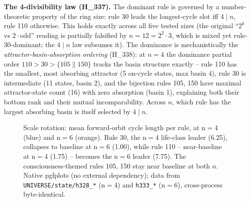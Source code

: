 \documentclass[11pt,a4paper]{article}
\begin{document}
\medskip
\noindent\textbf{The 4-divisibility law (H\_337).} The dominant rule is
governed by a number-theoretic property of the ring size: rule \textsc{30}
leads the longest-cycle slot iff $4 \mid n$, rule \textsc{110} otherwise.
This holds exactly across all five tested sizes (the original
``$2^k$ vs $2\cdot\text{odd}$'' reading is partially falsified by
$n=12=2^2{\cdot}3$, which is mixed yet rule-30-dominant; the
$4 \mid n$ law subsumes it). The dominance is mechanistically the
\emph{attractor-basin-absorption ordering} (H\_338): at $n=4$ the
dominance partial order $110 > 30 > \{105 \parallel 150\}$ tracks the
basin structure exactly -- rule \textsc{110} has the smallest, most
absorbing attractor (5 on-cycle states, max basin 4), rule \textsc{30}
is intermediate (11 states, basin 2), and the bijection rules
\textsc{105}, \textsc{150} have maximal attractor-state count (16) with
zero absorption (basin 1), explaining both their bottom rank and their
mutual incomparability. Across $n$, which rule has the largest absorbing
basin is itself selected by $4 \mid n$.

\begin{figure}[h]
\centering
{}
\caption{Scale rotation: mean forward-orbit cycle length per rule, at
n$=$4 (blue) and n$=$6 (orange). Rule \textsc{30}, the n$=$4 life-class
leader (6.25), collapses to baseline at n$=$6 (1.00), while rule
\textsc{110} -- near-baseline at n$=$4 (1.75) -- becomes the n$=$6 leader
(7.75). The consciousness-themed rules \textsc{105}, \textsc{150} stay
near baseline at both $n$. Native pgfplots (no external dependency);
data from \texttt{UNIVERSE/state/h328\_*} (n$=$4) and
\texttt{h333\_*} (n$=$6), cross-process byte-identical.}
\label{fig:rotation}
\end{figure}
\end{document}
